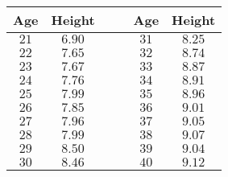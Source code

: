 \begin{tabular}{ccrrcc} \toprule
Age  & Height &&& Age  & Height \\\midrule
$21$ & $6.90$ &&& $31$ & $8.25$ \\
$22$ & $7.65$ &&& $32$ & $8.74$ \\
$23$ & $7.67$ &&& $33$ & $8.87$ \\
$24$ & $7.76$ &&& $34$ & $8.91$ \\
$25$ & $7.99$ &&& $35$ & $8.96$ \\
$26$ & $7.85$ &&& $36$ & $9.01$ \\
$27$ & $7.96$ &&& $37$ & $9.05$ \\
$28$ & $7.99$ &&& $38$ & $9.07$ \\
$29$ & $8.50$ &&& $39$ & $9.04$ \\
$30$ & $8.46$ &&& $40$ & $9.12$ \\\bottomrule
\end{tabular}
